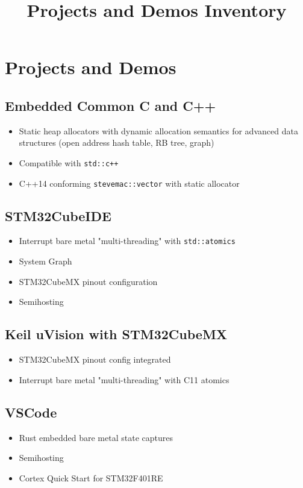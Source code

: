 \documentclass{article}
\title{Projects and Demos Inventory}
\author{}
\date{}
\begin{document}
\maketitle

\section*{Projects and Demos}

\subsection*{Embedded Common C and C++}
\begin{itemize}
    \item Static heap allocators with dynamic allocation semantics for advanced data structures (open address hash table, RB tree, graph)
    \item Compatible with \texttt{std::c++}
    \item C++14 conforming \texttt{stevemac::vector} with static allocator
\end{itemize}

\subsection*{STM32CubeIDE}
\begin{itemize}
    \item Interrupt bare metal "multi-threading" with \texttt{std::atomics}
    \item System Graph
    \item STM32CubeMX pinout configuration
    \item Semihosting
\end{itemize}

\subsection*{Keil uVision with STM32CubeMX}
\begin{itemize}
    \item STM32CubeMX pinout config integrated
    \item Interrupt bare metal "multi-threading" with C11 atomics
\end{itemize}

\subsection*{VSCode}
\begin{itemize}
    \item Rust embedded bare metal state captures
    \item Semihosting
    \item Cortex Quick Start for STM32F401RE
\end{itemize}
\end{document}

